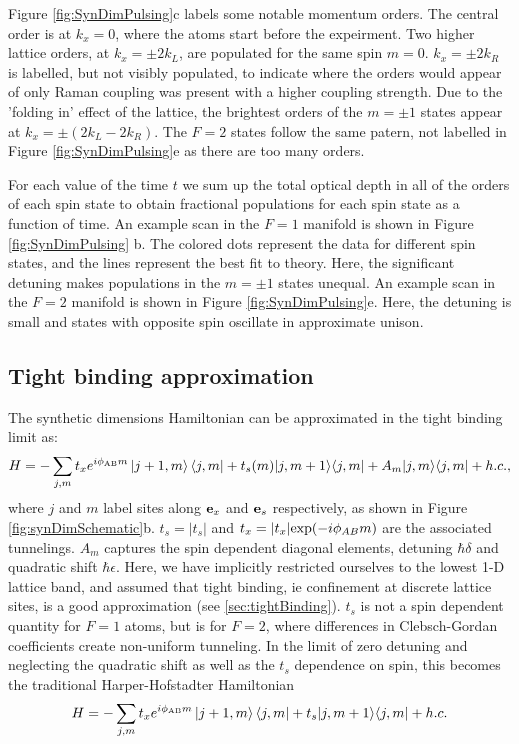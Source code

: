 Figure \ref{fig:SynDimPulsing}c labels some notable momentum orders. The central order is at $k_x=0$, where the atoms start before the expeirment. Two higher lattice orders, at $k_x=\pm2k_L$, are populated for the same spin $m=0$. $k_x=\pm2k_R$ is labelled, but not visibly populated, to indicate where the orders would appear of only Raman coupling was present with a higher coupling strength. Due to the 'folding in' effect of the lattice, the brightest orders of the $m=\pm 1$ states appear at $k_x=\pm (2k_L-2k_R)$. The $F=2$ states follow the same patern, not labelled in Figure \ref{fig:SynDimPulsing}e as there are too many orders.  

For each value of the time $t$ we sum up the total optical depth in all of the orders of each spin state to obtain fractional populations for each spin state as a function of time. An example scan in the $F=1$ manifold is shown in Figure \ref{fig:SynDimPulsing} b. The colored dots represent the data for different spin states, and the lines represent the best fit to theory. Here, the significant detuning makes populations in the $m=\pm 1$ states unequal. An example scan in the $F=2$ manifold is shown in Figure \ref{fig:SynDimPulsing}e. Here, the detuning is small and states with opposite spin oscillate in approximate unison.

\subsection{Tight binding approximation}

The synthetic dimensions Hamiltonian can be approximated in the tight binding limit as:
\begin{equation}
H=-\sum_{j,m} t_x e^{i\phi_{\rm AB}m}\mathinner{|{j+1,m}\rangle}\mathinner{\langle{j,m}|}+t_s(m)|j,m+1\rangle\langle j,m| + A_m|j,m\rangle\langle j,m| + h.c.,
\end{equation}
where $j$ and $m$ label sites along ${\bf e}_x$ and ${\bf e}_s$ respectively, as shown in Figure \ref{fig:synDimSchematic}b. $t_s=|t_s|$ and $t_x=|t_x|{\rm exp}(-i\phi_{AB}m)$ are the associated tunnelings. $A_m$ captures the spin dependent diagonal elements, detuning $\hbar\delta$ and quadratic shift $\hbar\epsilon$. Here, we have implicitly restricted ourselves to the lowest 1-D lattice band, and assumed that tight binding, ie confinement at discrete lattice sites, is a good approximation (see \ref{sec:tightBinding}).  $t_s$ is not a spin dependent quantity for $F=1$ atoms, but is for $F=2$, where differences in Clebsch-Gordan coefficients create non-uniform tunneling. In the limit of zero detuning and neglecting the quadratic shift as well as the $t_s$ dependence on spin, this becomes the traditional Harper-Hofstadter Hamiltonian
\begin{equation}
H=-\sum_{j,m} t_x e^{i\phi_{\rm AB}m}\mathinner{|{j+1,m}\rangle}\mathinner{\langle{j,m}|}+t_s|j,m+1\rangle\langle j,m| +  h.c.
\end{equation} 

